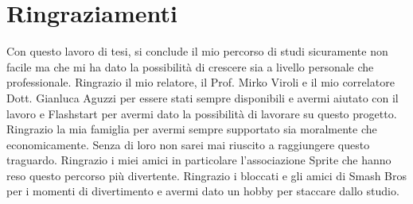 \documentclass[12pt,a4paper,openright,twoside]{book}
\begin{document}
\chapter*{Ringraziamenti}
Con questo lavoro di tesi, si conclude il mio percorso di studi
sicuramente non facile ma che mi ha dato la possibilità di crescere sia
a livello personale che professionale. \break
Ringrazio il mio relatore, il Prof. Mirko Viroli e il mio correlatore
Dott. Gianluca Aguzzi per essere stati sempre disponibili e avermi aiutato con il lavoro e Flashstart
per avermi dato la possibilità di lavorare su questo progetto. \break
Ringrazio la mia famiglia per avermi sempre supportato sia moralmente che economicamente. Senza
di loro non sarei mai riuscito a raggiungere questo traguardo. \break
Ringrazio i miei amici in particolare l'associazione Sprite che hanno
reso questo percorso più divertente.
Ringrazio i bloccati e gli amici di Smash Bros per i momenti di divertimento e avermi dato un hobby per
staccare dallo studio.
\end{document}

